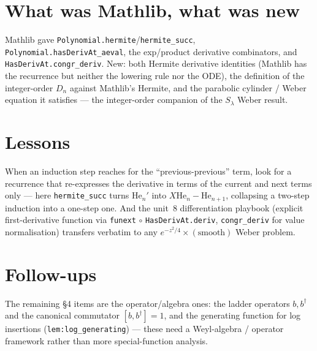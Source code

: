 \documentclass[11pt]{article}
\begin{document}
\section{What was Mathlib, what was new}
Mathlib gave \texttt{Polynomial.hermite}/\texttt{hermite\_succ}, \texttt{Polynomial.hasDerivAt\_aeval},
the exp/product derivative combinators, and \texttt{HasDerivAt.congr\_deriv}. New: both Hermite
derivative identities (Mathlib has the recurrence but neither the lowering rule nor the ODE), the
definition of the integer-order $D_n$ against Mathlib's Hermite, and the parabolic cylinder / Weber
equation it satisfies --- the integer-order companion of the $S_\lambda$ Weber result.

\section{Lessons}
When an induction step reaches for the ``previous-previous'' term, look for a recurrence that
re-expresses the derivative in terms of the current and next terms only --- here \texttt{hermite\_succ}
turns $\mathrm{He}_n'$ into $X\mathrm{He}_n-\mathrm{He}_{n+1}$, collapsing a two-step induction into a
one-step one. And the unit~8 differentiation playbook (explicit first-derivative function via
\texttt{funext}$\,\circ\,$\texttt{HasDerivAt.deriv}, \texttt{congr\_deriv} for value normalisation)
transfers verbatim to any $e^{-z^2/4}\times(\text{smooth})$ Weber problem.

\section{Follow-ups}
The remaining \S4 items are the operator/algebra ones: the ladder operators $b,b^\dagger$ and the
canonical commutator $[b,b^\dagger]=1$, and the generating function for log insertions
(\texttt{lem:log\_generating}) --- these need a Weyl-algebra / operator framework rather than more
special-function analysis.
\end{document}
